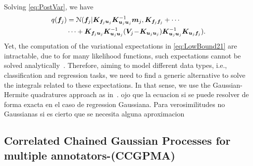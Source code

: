 \documentclass[journal]{IEEEtran}
\providecommand{\ve}[1]{{\bm{#1}}}%
\providecommand{\mat}[1]{{\bm{#1}}} %
\providecommand{\ve}[1]{{\mathbf{#1}}}
\providecommand{\mat}[1]{{\mathbf{#1}}}
\newcommand{\gauss}{\mathcal{N}} %
\newcommand{\comment}[2]{{\color{blue}#1} {\color{red}#2}}
\begin{document}
Solving \cref{eq:PostVar}, we have
\begin{align}
\notag q(\ve{f}_j) &= \gauss(\ve{f}_j|\mat{K}_{\ve{f}_j\ve{u}_j}\mat{K}_{\ve{u}_j\ve{u}_j}^{-1}\ve{m}_j, \mat{K}_{\ve{f}_j\ve{f}_j} + \cdots \\
&\cdots + \mat{K}_{\ve{f}_j\ve{u}_j}\mat{K}_{\ve{u}_j\ve{u}_j}^{-1}(\mat{V}_j\!-\!\mat{K}_{\ve{u}_j\ve{u}_j})\mat{K}_{\ve{u}_j\ve{u}_j}^{-1}\mat{K}_{\ve{u}_j\ve{f}_j}).
\end{align}
Yet, the computation of the variational expectations in \cref{eq:LowBound21} are intractable, due to for many likelihood functions, such expectations cannot be solved analytically~\cite{saul2016chained,moreno2018heterogeneous}. \comment{Therefore, aiming to model different data types, i.e., classification and regression tasks, we need to find a generic alternative to solve the integrals related to these expectations. In that sense, we use the Gaussian-Hermite quadratures approach as in~\cite{hensman2015scalable,saul2016chained}.}{ojo que la ecuacion si se puede resolver de forma exacta en el caso de regression Gaussiana. Para verosimilitudes no Gaussianas si es cierto que se necesita alguna aproximacion} 

\subsection{Correlated Chained Gaussian Processes for multiple  annotators-(CCGPMA)} 
\end{document}
